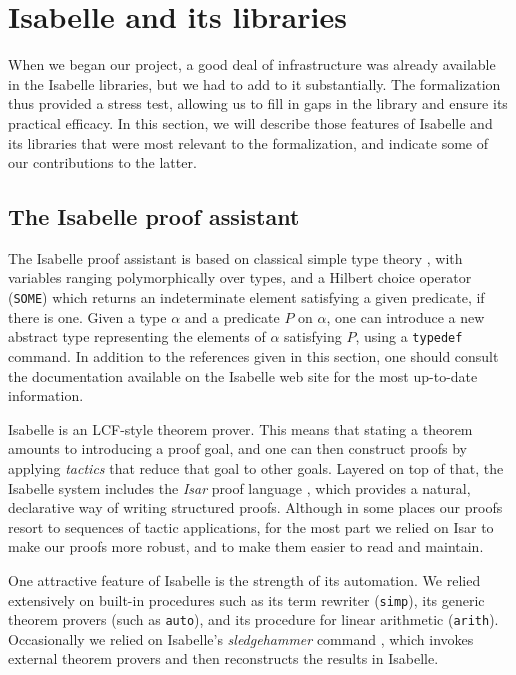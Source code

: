 \documentclass{svjour3}
\begin{document}
\section{Isabelle and its libraries}
\label{section:isabelle}

When we began our project, a good deal of infrastructure was already available in the Isabelle libraries, but we had to add to it substantially. The formalization thus provided a stress test, allowing us to fill in gaps in the library and ensure its practical efficacy. In this section, we will describe those features of Isabelle and its libraries that were most relevant to the formalization, and indicate some of our contributions to the latter.

\subsection{The Isabelle proof assistant}

The Isabelle proof assistant \cite{nipkow:et:al:02} is based on classical simple type theory \cite{church:40}, with variables ranging polymorphically over types, and a Hilbert choice operator (\texttt{SOME}) which returns an indeterminate element satisfying a given predicate, if there is one. Given a type $\alpha$ and a predicate $P$ on $\alpha$, one can introduce a new abstract type representing the elements of $\alpha$ satisfying $P$, using a \texttt{typedef} command. In addition to the references given in this section, one should consult the documentation available on the Isabelle web site for the most up-to-date information.

Isabelle is an LCF-style theorem prover. This means that stating a theorem amounts to introducing a proof goal, and one can then construct proofs by applying \emph{tactics} that reduce that goal to other goals. Layered on top of that, the Isabelle system includes the \emph{Isar} proof language \cite{wenzel:02}, which provides a natural, declarative way of writing structured proofs. Although in some places our proofs resort to sequences of tactic applications, for the most part we relied on Isar to make our proofs more robust, and to make them easier to read and maintain.

One attractive feature of Isabelle is the strength of its automation. We relied extensively on built-in procedures such as its term rewriter (\texttt{simp}), its generic theorem provers (such as \texttt{auto}), and its procedure for linear arithmetic (\texttt{arith}). Occasionally we relied on Isabelle's \emph{sledgehammer} command \cite{paulson:10}, which invokes external theorem provers and then reconstructs the results in Isabelle.
\end{document}
